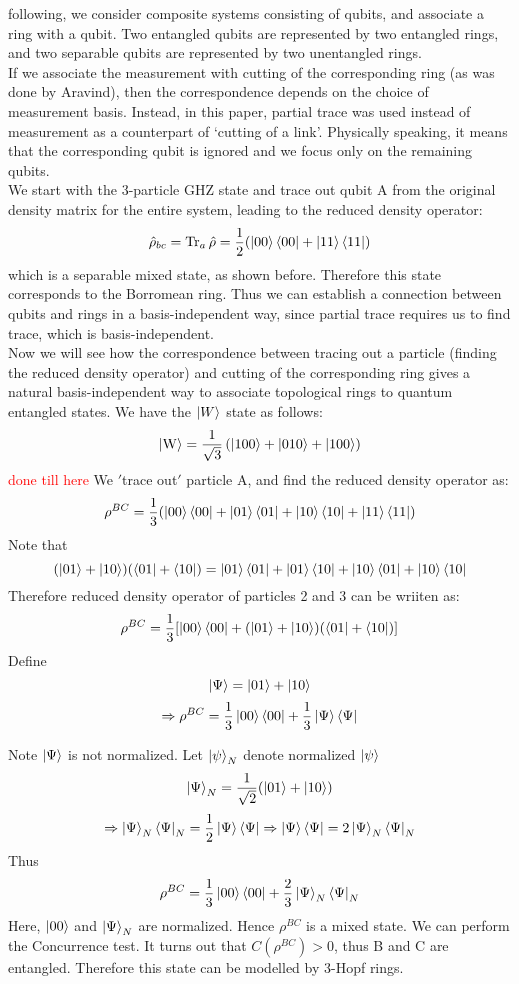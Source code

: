 \documentclass{scrartcl}
\begin{document}
 following, we consider composite systems consisting of qubits, and associate a ring
 with a qubit. Two entangled qubits are represented by two entangled rings, and two separable qubits are represented by two unentangled rings.\\[0.3cm] If we associate the measurement with cutting of the corresponding ring (as was done by Aravind), then the correspondence  depends on the choice of measurement basis. Instead, in this paper, partial trace was used instead of measurement as a counterpart of `cutting of a link'. Physically speaking, it means that the corresponding qubit is ignored and we focus only on the remaining qubits.\\[0.3cm]
We start with the 3-particle GHZ state and trace out qubit A from the original density matrix for the entire system, leading to the reduced density operator:
\[
\hat{\rho}_{bc} = \Tr_a\hat{\rho} = \frac{1}{2}(\ket{00}\bra{00}+\ket{11}\bra{11})
\]
which is a separable mixed state, as shown before. Therefore this state corresponds to the Borromean ring. Thus we can establish a connection between qubits and rings in a basis-independent way, since partial trace requires us to find trace, which is basis-independent.\\[0.3cm]
Now we will see how the correspondence between tracing out a particle (finding the reduced density operator) and cutting of the corresponding ring gives a natural basis-independent way to associate topological rings to quantum entangled states. We have the $\ket{W}$ state as follows:
\[
\ket{\mathrm{W}} = \frac{1}{\sqrt{3}}\left( \ket{100}+\ket{010}+\ket{100} \right)
\]
\textcolor{red}{done till here}
We $'$trace out$'$ particle A, and find the reduced density operator as:
\[
\rho^{BC} = \frac{1}{3}(\ket{00}\bra{00}+\ket{01}\bra{01}+\ket{10}\bra{10}+\ket{11}\bra{11})
\]
Note that
\[
(\ket{01}+\ket{10})(\bra{01}+\bra{10}) = \ket{01}\bra{01}+\ket{01}\bra{10}+\ket{10}\bra{01}+\ket{10}\bra{10}
\]
Therefore reduced density operator of particles 2 and 3 can be wriiten as:
\[
 \rho^{BC} = \frac{1}{3}[\ket{00}\bra{00}+(\ket{01}+\ket{10})(\bra{01}+\bra{10})]
\]
Define
\[
\ket{\Psi} = \ket{01}+\ket{10}
\]
\[
\Rightarrow \rho^{BC} = \frac{1}{3}\ket{00}\bra{00}+\frac{1}{3}\ket{\Psi}\bra{\Psi}
\]

Note $\ket{\Psi}$ is not normalized.
Let $\ket{\psi}_N$ denote normalized $\ket{\psi}$
\[
\ket{\Psi}_N = \frac{1}{\sqrt{2}}(\ket{01}+\ket{10})
\]
\[
\Rightarrow \ket{\Psi}_N\bra{\Psi}_N= \frac{1}{2}\ket{\Psi}\bra{\Psi}
\Rightarrow \ket{\Psi}\bra{\Psi} = 2\ket{\Psi}_N\bra{\Psi}_N
\]
Thus 
\[
\rho^{BC} = \frac{1}{3}\ket{00}\bra{00}+\frac{2}{3}\ket{\Psi}_N\bra{\Psi}_N
\]
Here, $\ket{00}$ and $\ket{\Psi}_N$ are normalized. Hence $\rho^{BC}$ is a mixed state. We can perform the Concurrence test. It turns out that $C(\rho^{BC})>0$, thus B and C are entangled. Therefore this state can be modelled by 3-Hopf rings.
\end{document}
